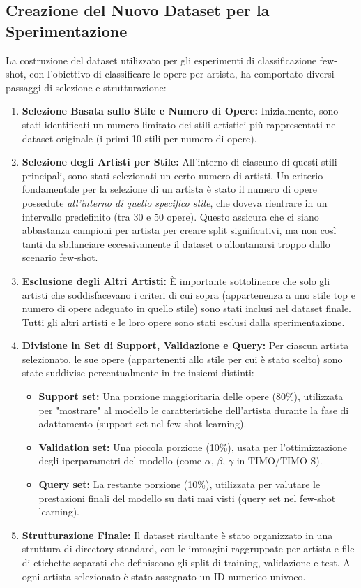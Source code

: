 \documentclass[11pt,a4paper]{article}
\begin{document}
\subsection{Creazione del Nuovo Dataset per la Sperimentazione}
La costruzione del dataset utilizzato per gli esperimenti di classificazione few-shot, con l'obiettivo di classificare le opere per artista, ha comportato diversi passaggi di selezione e strutturazione:
\begin{enumerate}
    \item \textbf{Selezione Basata sullo Stile e Numero di Opere:}
    Inizialmente, sono stati identificati un numero limitato dei stili artistici più rappresentati nel dataset originale (i primi 10 stili per numero di opere).
    \item \textbf{Selezione degli Artisti per Stile:}
    All'interno di ciascuno di questi stili principali, sono stati selezionati un certo numero di artisti. Un criterio fondamentale per la selezione di un artista è stato il numero di opere possedute \textit{all'interno di quello specifico stile}, che doveva rientrare in un intervallo predefinito (tra 30 e 50 opere). Questo assicura che ci siano abbastanza campioni per artista per creare split significativi, ma non così tanti da sbilanciare eccessivamente il dataset o allontanarsi troppo dallo scenario few-shot.
    \item \textbf{Esclusione degli Altri Artisti:}
    È importante sottolineare che solo gli artisti che soddisfacevano i criteri di cui sopra (appartenenza a uno stile top e numero di opere adeguato in quello stile) sono stati inclusi nel dataset finale. Tutti gli altri artisti e le loro opere sono stati esclusi dalla sperimentazione.
    \item \textbf{Divisione in Set di Support, Validazione e Query:}
    Per ciascun artista selezionato, le sue opere (appartenenti allo stile per cui è stato scelto) sono state suddivise percentualmente in tre insiemi distinti:
    \begin{itemize}
        \item \textbf{Support set:} Una porzione maggioritaria delle opere (80\%), utilizzata per "mostrare" al modello le caratteristiche dell'artista durante la fase di adattamento (support set nel few-shot learning).
        \item \textbf{Validation set:} Una piccola porzione (10\%), usata per l'ottimizzazione degli iperparametri del modello (come $\alpha$, $\beta$, $\gamma$ in TIMO/TIMO-S).
        \item \textbf{Query set:} La restante porzione (10\%), utilizzata per valutare le prestazioni finali del modello su dati mai visti (query set nel few-shot learning).
    \end{itemize}
    \item \textbf{Strutturazione Finale:}
    Il dataset risultante è stato organizzato in una struttura di directory standard, con le immagini raggruppate per artista e file di etichette separati che definiscono gli split di training, validazione e test. A ogni artista selezionato è stato assegnato un ID numerico univoco.
\end{enumerate}
\end{document}
